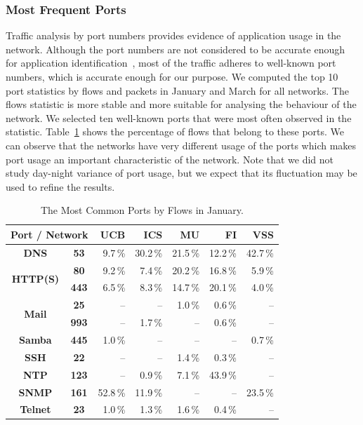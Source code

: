 \subsubsection{Most Frequent Ports}
Traffic analysis by port numbers provides evidence of application usage in the network. Although the port numbers are not considered to be accurate enough for application identification~\cite{Moore-2005-Toward}, most of the traffic adheres to well-known port numbers, which is accurate enough for our purpose. We computed the top 10 port statistics by flows and packets in January and March for all networks. The flows statistic is more stable and more suitable for analysing the behaviour of the network. We selected ten well-known ports that were most often observed in the statistic. Table~\ref{tab:characterization-ports} shows the percentage of flows that belong to these ports. We can observe that the networks have very different usage of the ports which makes port usage an important characteristic of the network. Note that we did not study day-night variance of port usage, but we expect that its fluctuation may be used to refine the results.

\begin{table}[!t]
        \centering
        \renewcommand{\arraystretch}{1.1}
        \begin{tabular}{|c|c|r|r|r|r|r|} \hline
                \multicolumn{2}{|c|}{\textbf{Port / Network}} & \textbf{UCB} & \textbf{ICS} & \textbf{MU} & \textbf{FI} & \textbf{VSS} \\ \hline
                \textbf{DNS} & \textbf{53} & 9.7\,\% & 30.2\,\% & 21.5\,\% & 12.2\,\% & 42.7\,\% \\ \hline
                \multirow{2}{*}{\textbf{HTTP(S)}} & \textbf{80} & 9.2\,\% & 7.4\,\% & 20.2\,\% & 16.8\,\% & 5.9\,\% \\ \cline{2-7}
                & \textbf{443} & 6.5\,\% & 8.3\,\% & 14.7\,\% & 20.1\,\% & 4.0\,\% \\ \hline
                \multirow{2}{*}{\textbf{Mail}} & \textbf{25} & -- & -- & 1.0\,\% & 0.6\,\% & -- \\  \cline{2-7}
                & \textbf{993} & -- & 1.7\,\% & -- & 0.6\,\% & -- \\ \cline{1-7}
                \textbf{Samba} & \textbf{445} & 1.0\,\% & -- & -- & -- & 0.7\,\%  \\ \hline
                \textbf{SSH} & \textbf{22} & -- & -- & 1.4\,\% & 0.3\,\% & -- \\ \hline
                \textbf{NTP} & \textbf{123} & -- & 0.9\,\% & 7.1\,\% & 43.9\,\% & -- \\ \hline
                \textbf{SNMP} & \textbf{161} & 52.8\,\% & 11.9\,\% & -- & -- & 23.5\,\% \\ \hline
                \textbf{Telnet} & \textbf{23} & 1.0\,\% & 1.3\,\% & 1.6\,\% & 0.4\,\% & -- \\ \hline
        \end{tabular}
        \caption{The Most Common Ports by Flows in January.}
        \label{tab:characterization-ports}
\end{table}

